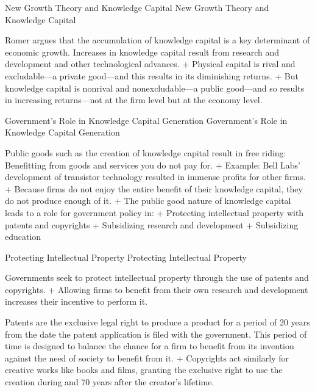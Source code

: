 \documentclass[
  12pt,
  ignorenonframetext,
]{beamer}
\begin{document}
\begin{frame}{New Growth Theory and Knowledge Capital}
\protect\hypertarget{new-growth-theory-and-knowledge-capital}{}
New Growth Theory and Knowledge Capital

Romer argues that the accumulation of knowledge capital is a key
determinant of economic growth. Increases in knowledge capital result
from research and development and other technological advances. +
Physical capital is rival and excludable---a private good---and this
results in its diminishing returns. + But knowledge capital is nonrival
and nonexcludable---a public good---and so results in increasing
returns---not at the firm level but at the economy level.
\end{frame}

\begin{frame}{Government's Role in Knowledge Capital Generation}
\protect\hypertarget{governments-role-in-knowledge-capital-generation}{}
Government's Role in Knowledge Capital Generation

Public goods such as the creation of knowledge capital result in free
riding: Benefitting from goods and services you do not pay for. +
Example: Bell Labs' development of transistor technology resulted in
immense profits for other firms. + Because firms do not enjoy the entire
benefit of their knowledge capital, they do not produce enough of it. +
The public good nature of knowledge capital leads to a role for
government policy in: + Protecting intellectual property with patents
and copyrights + Subsidizing research and development + Subsidizing
education
\end{frame}

\begin{frame}{Protecting Intellectual Property}
\protect\hypertarget{protecting-intellectual-property}{}
Protecting Intellectual Property

Governments seek to protect intellectual property through the use of
patents and copyrights. + Allowing firms to benefit from their own
research and development increases their incentive to perform it.

Patents are the exclusive legal right to produce a product for a period
of 20 years from the date the patent application is filed with the
government. This period of time is designed to balance the chance for a
firm to benefit from its invention against the need of society to
benefit from it. + Copyrights act similarly for creative works like
books and films, granting the exclusive right to use the creation during
and 70 years after the creator's lifetime.
\end{frame}
\end{document}
